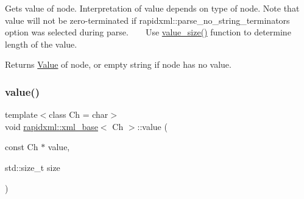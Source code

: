 Gets value of node. Interpretation of value depends on type of node. Note that value will not be zero-\/terminated if rapidxml\+::parse\+\_\+no\+\_\+string\+\_\+terminators option was selected during parse. ~\newline
~\newline
 Use \hyperlink{classrapidxml_1_1xml__base_a2eb123d471b1567fa4832b6ee2b75493}{value\+\_\+size()} function to determine length of the value. \begin{DoxyReturn}{Returns}
\hyperlink{classValue}{Value} of node, or empty string if node has no value. 
\end{DoxyReturn}
\mbox{\label{classrapidxml_1_1xml__base_a3b183c2db7022a6d30494dd2f0ac11e9}} 
\subsubsection{\texorpdfstring{value()}{value()}\hspace{0.1cm}{\footnotesize\ttfamily [2/3]}}
{\footnotesize\ttfamily template$<$class Ch  = char$>$ \\
void \hyperlink{classrapidxml_1_1xml__base}{rapidxml\+::xml\+\_\+base}$<$ Ch $>$\+::value (\begin{DoxyParamCaption}\item[{const Ch $\ast$}]{value,  }\item[{std\+::size\+\_\+t}]{size }\end{DoxyParamCaption})\hspace{0.3cm}{\ttfamily [inline]}}

